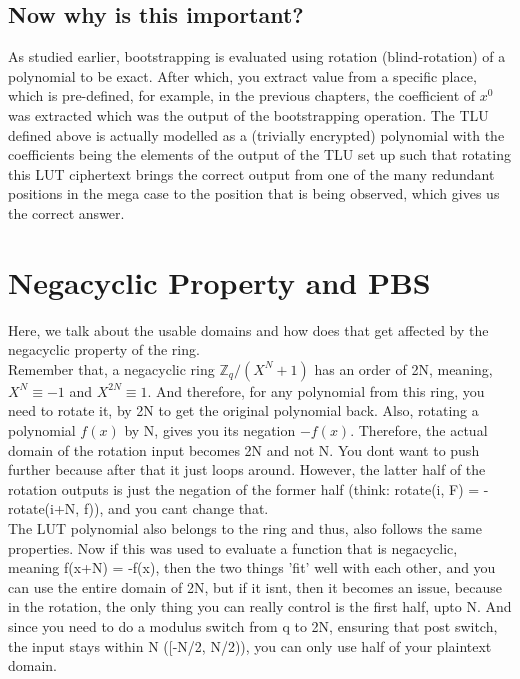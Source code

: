 \documentclass{report}
\begin{document}
\subsection{Now why is this important?}
As studied earlier, bootstrapping is evaluated using rotation (blind-rotation) of a polynomial to be exact. After which, you extract value from a specific place, which is pre-defined, for example, in the previous chapters, the coefficient of $x^0$ was extracted which was the output of the bootstrapping operation. The TLU defined above is actually modelled as a (trivially encrypted) polynomial with the coefficients being the elements of the output of the TLU set up such that rotating this LUT ciphertext brings the correct output from one of the many redundant positions in the mega case to the position that is being observed, which gives us the correct answer.

\section{Negacyclic Property and PBS}
Here, we talk about the usable domains and how does that get affected by the negacyclic property of the ring.\\
Remember that, a negacyclic ring $\mathbb{Z}_q/(X^N + 1)$ has an order of 2N, meaning, $X^N \equiv -1$ and $X^{2N }\equiv 1$. And therefore, for any polynomial from this ring, you need to rotate it, by 2N to get the original polynomial back. Also, rotating a polynomial $f(x)$ by N, gives you its negation $-f(x)$. Therefore, the actual domain of the rotation input becomes 2N and not N. You dont want to push further because after that it just loops around. However, the latter half of the rotation outputs is just the negation of the former half (think: rotate(i, F) = - rotate(i+N, f)), and you cant change that.\\
The LUT polynomial also belongs to the ring and thus, also follows the same properties. Now if this was used to evaluate a function that is negacyclic, meaning f(x+N) = -f(x), then the two things 'fit' well with each other, and you can use the entire domain of 2N, but if it isnt, then it becomes an issue, because in the rotation, the only thing you can really control is the first half, upto N. And since you need to do a modulus switch from q to 2N, ensuring that post switch, the input stays within N ([-N/2, N/2)), you can only use half of your plaintext domain.
\end{document}
